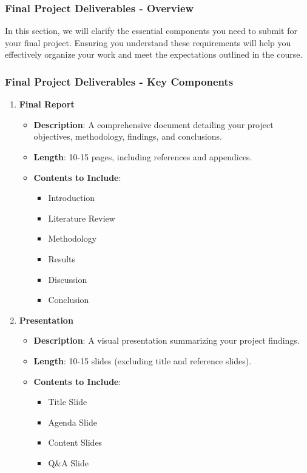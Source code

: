 \documentclass{beamer}
\begin{document}
\begin{frame}[fragile]
    \frametitle{Final Project Deliverables - Overview}
    In this section, we will clarify the essential components you need to submit for your final project. 
    Ensuring you understand these requirements will help you effectively organize your work and meet the expectations outlined in the course.
\end{frame}

\begin{frame}[fragile]
    \frametitle{Final Project Deliverables - Key Components}
    \begin{enumerate}
        \item \textbf{Final Report}
            \begin{itemize}
                \item \textbf{Description}: A comprehensive document detailing your project objectives, methodology, findings, and conclusions.
                \item \textbf{Length}: 10-15 pages, including references and appendices.
                \item \textbf{Contents to Include}:
                    \begin{itemize}
                        \item Introduction
                        \item Literature Review
                        \item Methodology
                        \item Results
                        \item Discussion
                        \item Conclusion
                    \end{itemize}
            \end{itemize}
            
        \item \textbf{Presentation}
            \begin{itemize}
                \item \textbf{Description}: A visual presentation summarizing your project findings.
                \item \textbf{Length}: 10-15 slides (excluding title and reference slides).
                \item \textbf{Contents to Include}:
                    \begin{itemize}
                        \item Title Slide
                        \item Agenda Slide
                        \item Content Slides
                        \item Q\&A Slide
                    \end{itemize}
            \end{itemize}


\end{enumerate}
\end{frame}
\end{document}
